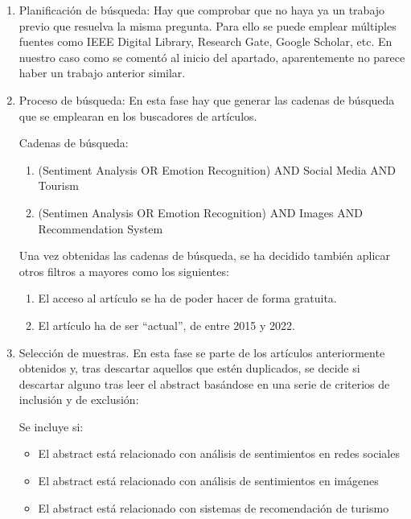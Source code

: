 \begin{enumerate}
    \item Planificación de búsqueda: Hay que comprobar que no haya ya un trabajo previo que resuelva la misma pregunta. Para ello se puede emplear múltiples fuentes como IEEE Digital Library, Research Gate, Google Scholar, etc. En nuestro caso como se comentó al inicio del apartado, aparentemente no parece haber un trabajo anterior similar.
    \item Proceso de búsqueda: En esta fase hay que generar las cadenas de búsqueda que se emplearan en los buscadores de artículos. %

    Cadenas de búsqueda:
    \begin{enumerate}
        \item (Sentiment Analysis OR Emotion Recognition) AND Social Media AND Tourism
        \item (Sentimen Analysis OR Emotion Recognition) AND Images AND Recommendation System
    \end{enumerate}
    
    Una vez obtenidas las cadenas de búsqueda, se ha decidido también aplicar otros filtros a mayores como los siguientes:
    
    \begin{enumerate}
        \item El acceso al artículo se ha de poder hacer de forma gratuita.
        \item El artículo ha de ser ``actual'', de entre 2015 y 2022.
    \end{enumerate}

    \item Selección de muestras. En esta fase se parte de los artículos anteriormente obtenidos y, tras descartar aquellos que estén duplicados, se decide si descartar alguno tras leer el abstract basándose en una serie de criterios de inclusión y de exclusión:

    Se incluye si:
    \begin{itemize}
        \item El abstract está relacionado con análisis de sentimientos en redes sociales
        \item El abstract está relacionado con análisis de sentimientos en imágenes
        \item El abstract está relacionado con sistemas de recomendación de turismo
    \end{itemize}
    

\end{enumerate}
